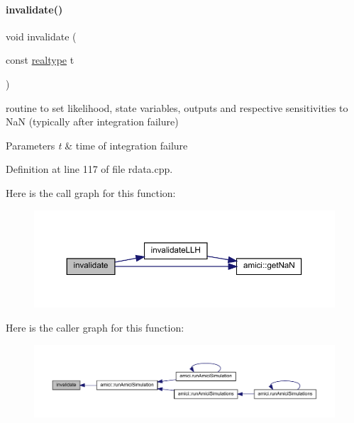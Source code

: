 \paragraph{\texorpdfstring{invalidate()}{invalidate()}}
{\footnotesize\ttfamily void invalidate (\begin{DoxyParamCaption}\item[{const \mbox{\hyperlink{namespaceamici_a1bdce28051d6a53868f7ccbf5f2c14a3}{realtype}}}]{t }\end{DoxyParamCaption})}

routine to set likelihood, state variables, outputs and respective sensitivities to NaN (typically after integration failure) 
\begin{DoxyParams}{Parameters}
{\em t} & time of integration failure\\
\hline
\end{DoxyParams}


Definition at line 117 of file rdata.\+cpp.

Here is the call graph for this function\+:
\nopagebreak
\begin{figure}[H]
\begin{center}
\leavevmode
\includegraphics[width=350pt]{classamici_1_1_return_data_ab320e46748c17908f0bd4bba240b8e92_cgraph}
\end{center}
\end{figure}
Here is the caller graph for this function\+:
\nopagebreak
\begin{figure}[H]
\begin{center}
\leavevmode
\includegraphics[width=350pt]{classamici_1_1_return_data_ab320e46748c17908f0bd4bba240b8e92_icgraph}
\end{center}
\end{figure}
\mbox{\label{classamici_1_1_return_data_a03e88745280c032d3b59fd7235665e17}} 

